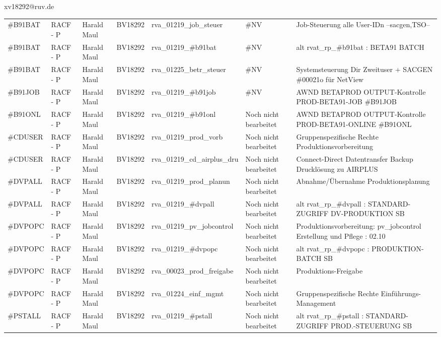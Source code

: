 \documentclass[a4paper,landscape,12pt]{letter}
\begin{document}
\begin{letter}{xv18292@ruv.de\hfill \break}
\begin{tiny}
\begin{longtable}{|p{35mm}|p{15mm}|p{25mm}|p{10mm}|p{40mm}|p{50mm}|p{50mm}|}
\#B91BAT & RACF - P & Harald Maul & BV18292 & rva\_01219\_job\_steuer & \#NV & Job-Steuerung alle User-IDn --sacgen,TSO-- \\
\#B91BAT & RACF - P & Harald Maul & BV18292 & rva\_01219\_\#b91bat & \#NV & alt rvat\_rp\_\#b91bat          : BETA91 BATCH \\
\#B91BAT & RACF - P & Harald Maul & BV18292 & rva\_01225\_betr\_steuer & \#NV & Systemsteuerung Dir Zweituser + SACGEN \#00021o für NetView \\
\#B91JOB & RACF - P & Harald Maul & BV18292 & rva\_01219\_\#b91job & \#NV & AWND BETAPROD OUTPUT-Kontrolle PROD-BETA91-JOB \#B91JOB \\
\#B91ONL & RACF - P & Harald Maul & BV18292 & rva\_01219\_\#b91onl & Noch nicht bearbeitet & AWND BETAPROD OUTPUT-Kontrolle PROD-BETA91-ONLINE \#B91ONL \\
\#CDUSER & RACF - P & Harald Maul & BV18292 & rva\_01219\_prod\_vorb & Noch nicht bearbeitet & Gruppenspezifische Rechte Produktionsvorbereitung \\
\#CDUSER & RACF - P & Harald Maul & BV18292 & rva\_01219\_cd\_airplus\_dru & Noch nicht bearbeitet & Connect-Direct Datentransfer Backup Drucklösung zu AIRPLUS \\
\#DVPALL & RACF - P & Harald Maul & BV18292 & rva\_01219\_prod\_planun & Noch nicht bearbeitet & Abnahme/Übernahme Produktionsplanung \\
\#DVPALL & RACF - P & Harald Maul & BV18292 & rva\_01219\_\#dvpall & Noch nicht bearbeitet & alt rvat\_rp\_\#dvpall          : STANDARD-ZUGRIFF DV-PRODUKTION SB \\
\#DVPOPC & RACF - P & Harald Maul & BV18292 & rva\_01219\_pv\_jobcontrol & Noch nicht bearbeitet & Produktionsvorbereitung: pv\_jobcontrol Erstellung und Pflege : 02.10 \\
\#DVPOPC & RACF - P & Harald Maul & BV18292 & rva\_01219\_\#dvpopc & Noch nicht bearbeitet & alt rvat\_rp\_\#dvpopc          : PRODUKTION-BATCH SB \\
\#DVPOPC & RACF - P & Harald Maul & BV18292 & rva\_00023\_prod\_freigabe & Noch nicht bearbeitet & Produktions-Freigabe \\
\#DVPOPC & RACF - P & Harald Maul & BV18292 & rva\_01224\_einf\_mgmt & Noch nicht bearbeitet & Gruppenspezifische Rechte Einführungs-Management \\
\#PSTALL & RACF - P & Harald Maul & BV18292 & rva\_01219\_\#pstall & Noch nicht bearbeitet & alt rvat\_rp\_\#pstall          : STANDARD-ZUGRIFF PROD.-STEUERUNG SB \\

\end{longtable}
\end{tiny}
\end{letter}
\end{document}
